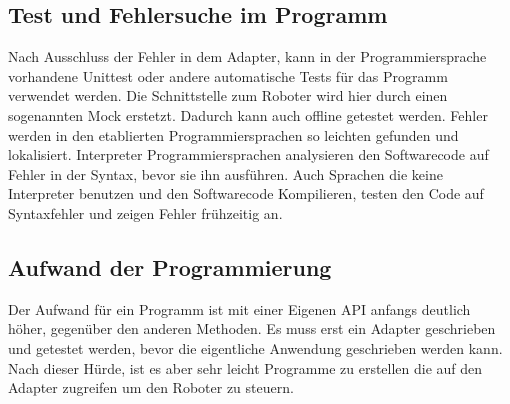 \subsection{Test und Fehlersuche im Programm}
\label{debuggen_mit_hoeherer schicht}

Nach Ausschluss der Fehler in dem Adapter, kann in der Programmiersprache vorhandene Unittest oder andere automatische Tests für das Programm verwendet werden. Die Schnittstelle zum Roboter wird hier durch einen sogenannten \ac{Mock} erstetzt. Dadurch kann auch offline getestet werden. Fehler werden in den etablierten Programmiersprachen so leichten gefunden und lokalisiert. \ac{Interpreter} Programmiersprachen analysieren den Softwarecode auf Fehler in der Syntax, bevor sie ihn ausführen. Auch Sprachen die keine \ac{Interpreter} benutzen und den Softwarecode Kompilieren, testen den Code auf Syntaxfehler und zeigen Fehler frühzeitig an.

\subsection{Aufwand der Programmierung}
\label{eigene_api_aufwand}

Der Aufwand für ein Programm ist mit einer Eigenen API anfangs deutlich höher, gegenüber den anderen Methoden. Es muss erst ein Adapter geschrieben und getestet werden, bevor die eigentliche Anwendung geschrieben werden kann. 
Nach dieser Hürde, ist es aber sehr leicht Programme zu erstellen die auf den Adapter zugreifen um den Roboter zu steuern.
